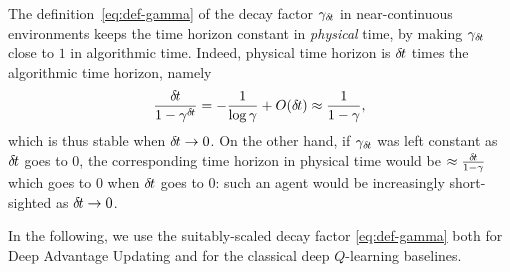 The definition~\eqref{eq:def-gamma} of the decay factor $\gamma_{\delta\hspace{-.1em}t}$ in
near-continuous environments keeps the time horizon constant in
\emph{physical} time, by making $\gamma_{\delta\hspace{-.1em}t}$ close to $1$ in
algorithmic time. Indeed, physical time horizon is ${\delta\hspace{-.1em}t}$ times the
algorithmic time horizon, namely
\begin{equation}
          \label{eq:time-horizon}
          \frac{{\delta\hspace{-.1em}t}}{1-\gamma^{\delta\hspace{-.1em}t}}
          = - \frac{1}{\log \gamma} + O({\delta\hspace{-.1em}t})
          \approx \frac{1}{1-\gamma},
        \end{equation}
which is thus stable when ${\delta\hspace{-.1em}t}\to 0$. 
On the other hand,
if $\gamma_{\delta\hspace{-.1em}t}$ was left constant
as ${\delta\hspace{-.1em}t}$ goes to $0$, the corresponding time horizon in physical time
would be $\approx \frac{{\delta\hspace{-.1em}t}}{1 - \gamma}$ which goes to $0$ when
${\delta\hspace{-.1em}t}$ goes to $0$: such an agent would be increasingly short-sighted
as ${\delta\hspace{-.1em}t}\to 0$.

In the following, we use the suitably-scaled decay factor
\eqref{eq:def-gamma} both for Deep Advantage Updating and for the
classical deep $Q$-learning baselines.
%       
        


